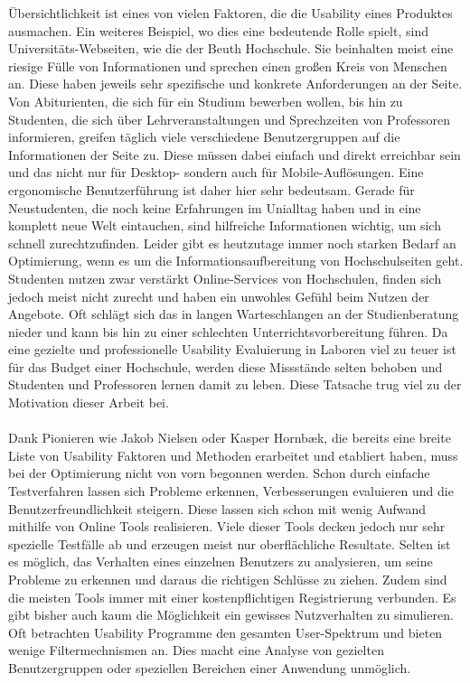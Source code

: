 Übersichtlichkeit ist eines von vielen Faktoren, die die Usability eines Produktes ausmachen. Ein weiteres Beispiel, wo dies eine bedeutende Rolle spielt, sind Universitäts-Webseiten, wie die der Beuth Hochschule. Sie beinhalten meist eine riesige Fülle von Informationen und sprechen einen großen Kreis von Menschen an. Diese haben jeweils sehr spezifische und konkrete Anforderungen an der Seite. Von Abiturienten, die sich für ein Studium bewerben wollen, bis hin zu Studenten, die sich über Lehrveranstaltungen und Sprechzeiten von Professoren informieren, greifen täglich viele verschiedene Benutzergruppen auf die Informationen der Seite zu. Diese müssen dabei einfach und direkt erreichbar sein und das nicht nur für Desktop- sondern auch für Mobile-Auflösungen. Eine ergonomische Benutzerführung ist daher hier sehr bedeutsam. Gerade für Neustudenten, die noch keine Erfahrungen im Unialltag haben und in eine komplett neue Welt eintauchen, sind hilfreiche Informationen wichtig, um sich schnell zurechtzufinden. Leider gibt es heutzutage immer noch starken Bedarf an Optimierung, wenn es um die Informationsaufbereitung von Hochschulseiten geht. Studenten nutzen zwar verstärkt Online-Services von Hochschulen, finden sich jedoch meist nicht zurecht und haben ein unwohles Gefühl beim Nutzen der Angebote. Oft schlägt sich das in langen Warteschlangen an der Studienberatung nieder und kann bis hin zu einer schlechten Unterrichtsvorbereitung führen. Da eine gezielte und professionelle Usability Evaluierung in Laboren viel zu teuer ist für das Budget einer Hochschule, werden diese Missstände selten behoben und Studenten und Professoren lernen damit zu leben. Diese Tatsache trug viel zu der Motivation dieser Arbeit bei.\\
\\
Dank Pionieren wie Jakob Nielsen oder Kasper Hornbæk, die bereits eine breite Liste von Usability Faktoren und Methoden erarbeitet und etabliert haben, muss bei der Optimierung nicht von vorn begonnen werden. Schon durch einfache Testverfahren lassen sich Probleme erkennen, Verbesserungen evaluieren und die Benutzerfreundlichkeit steigern. Diese lassen sich schon mit wenig Aufwand mithilfe von Online Tools realisieren. Viele dieser Tools decken jedoch nur sehr spezielle Testfälle ab und erzeugen meist nur oberflächliche Resultate. Selten ist es möglich, das Verhalten eines einzelnen Benutzers zu analysieren, um seine Probleme zu erkennen und daraus die richtigen Schlüsse zu ziehen. Zudem sind die meisten Tools immer mit einer kostenpflichtigen Registrierung verbunden. Es gibt bisher auch kaum die Möglichkeit ein gewisses Nutzverhalten zu simulieren. Oft betrachten Usability Programme den gesamten User-Spektrum und bieten wenige Filtermechnismen an. Dies macht eine Analyse von gezielten Benutzergruppen oder speziellen Bereichen einer Anwendung unmöglich.\\
